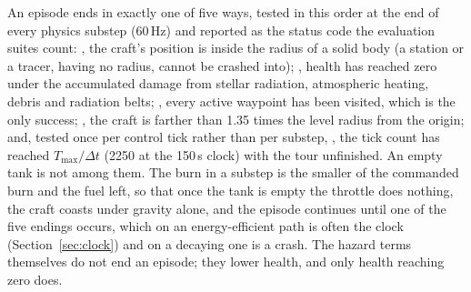 An episode ends in exactly one of five ways, tested in this order at the end
of every physics substep (60\,Hz) and reported as the status code the
evaluation suites count: , the craft's position is inside the
radius of a solid body (a station or a tracer, having no radius, cannot be
crashed into); , health has reached zero under the accumulated
damage from stellar radiation, atmospheric heating, debris and radiation
belts; , every active waypoint has been visited, which is the
only success; , the craft is farther than 1.35 times the level
radius from the origin; and, tested once per control tick rather than per
substep, , the tick count has reached $T_{\max}/\Delta t$ (2250
at the 150\,s clock) with the tour unfinished. An empty tank is not among
them. The burn in a substep is the smaller of the commanded burn and the fuel
left, so that once the tank is empty the throttle does nothing, the craft
coasts under gravity alone, and the episode continues until one of the five
endings occurs, which on an energy-efficient path is often the clock
(Section~\ref{sec:clock}) and on a decaying one is a crash. The hazard terms
themselves do not end an episode; they lower health, and only health reaching
zero does.
